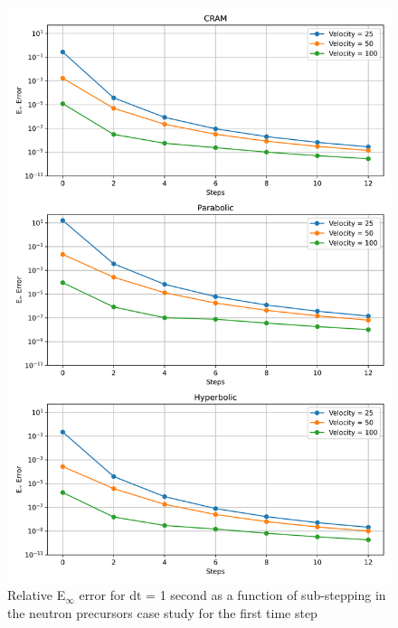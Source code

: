 \clearpage

\begin{figure}[p]
    \centering
    \includegraphics[width=5in]{images/chapter-5/caseStudies/neutronPrecursors/dt1/neutronPrecursorsEinfErrorerrorWithSteps.png}
    \caption{Relative E$_{\infty}$ error for dt = 1 second as a function of sub-stepping in the neutron precursors case study for the first time step}
    \label{fig:neutron_precursors_Einf_dt1_with_substeps}
\end{figure}

\clearpage

